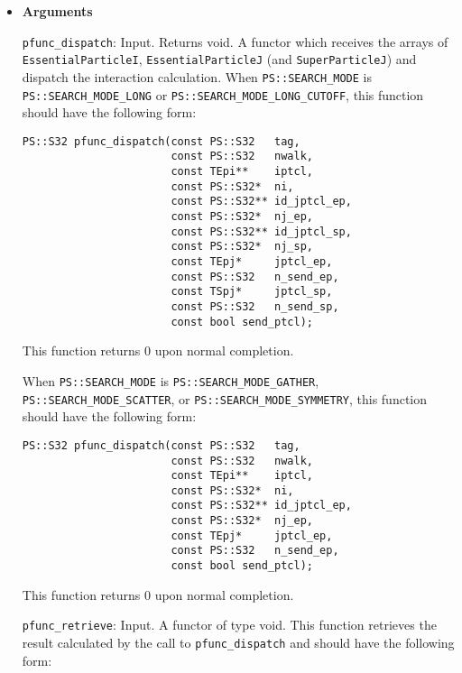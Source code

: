\begin{itemize}

\item {\bf Arguments}

\texttt{pfunc\_dispatch}: Input. Returns void. A functor which receives the arrays of \newline \texttt{EssentialParticleI}, \texttt{EssentialParticleJ} (and \texttt{SuperParticleJ}) and dispatch the interaction calculation. When \texttt{PS::SEARCH\_MODE} is \texttt{PS::SEARCH\_MODE\_LONG} or \newline \texttt{PS::SEARCH\_MODE\_LONG\_CUTOFF}, this function should have the following form:

\begin{verbatim}
PS::S32 pfunc_dispatch(const PS::S32   tag,
                       const PS::S32   nwalk,
                       const TEpi**    iptcl,
                       const PS::S32*  ni,
                       const PS::S32** id_jptcl_ep,
                       const PS::S32*  nj_ep,
                       const PS::S32** id_jptcl_sp,
                       const PS::S32*  nj_sp,
                       const TEpj*     jptcl_ep,
                       const PS::S32   n_send_ep,
                       const TSpj*     jptcl_sp,
                       const PS::S32   n_send_sp,
                       const bool send_ptcl);
\end{verbatim}

This function returns 0 upon normal completion.

When \texttt{PS::SEARCH\_MODE} is \texttt{PS::SEARCH\_MODE\_GATHER},
 \texttt{PS::SEARCH\_MODE\_SCATTER}, or \texttt{PS::SEARCH\_MODE\_SYMMETRY}, this function should have the following form:

\begin{verbatim}
PS::S32 pfunc_dispatch(const PS::S32   tag,
                       const PS::S32   nwalk,
                       const TEpi**    iptcl,
                       const PS::S32*  ni,
                       const PS::S32** id_jptcl_ep,
                       const PS::S32*  nj_ep,
                       const TEpj*     jptcl_ep,
                       const PS::S32   n_send_ep,
                       const bool send_ptcl);
\end{verbatim}

This function returns 0 upon normal completion.

\texttt{pfunc\_retrieve}: Input. A functor of type void. This function retrieves the result calculated by the call to \texttt{pfunc\_dispatch} and should have the following form:


\end{itemize}
